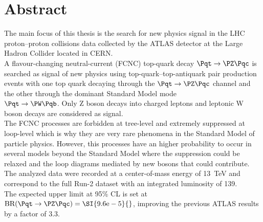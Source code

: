 \chapter*{Abstract}        %

\vspace{-1cm}
\begin{adjustwidth}{1.5cm}{1.5cm}
	The main focus of this thesis is the search for new physics signal in the
	LHC proton–proton collisions data collected by the ATLAS detector at 
	the Large Hadron Collider located in CERN.\\
	A flavour-changing neutral-current (FCNC) top-quark decay
	$\Pqt\rightarrow\PZ\Pqc$ is searched as signal of new physics using 
	top-quark–top-antiquark pair production events with one top quark 
	decaying through the $\Pqt\rightarrow\PZ\Pqc$ channel and the other 
	through the dominant Standard Model mode\\ $\Pqt\rightarrow\PW\Pqb$. 
	Only Z boson decays into charged leptons and leptonic W boson decays 
	are considered as signal.\\
	The FCNC processes are forbidden at tree-level and extremely suppressed at loop-level 
	which is why they are very rare phenomena in the Standard Model of particle physics.
	However, this processes have an higher probability to occur in several models beyond the Standard Model where the suppression could be relaxed and the loop diagrams mediated by new bosons that could contribute.\\
	The analyzed data were recorded at a center-of-mass energy of \SI{13}{\TeV} and correspond to the full Run-2 dataset with an integrated luminosity of \SI{139}{\ifb}.\\
	The expected upper limit at 95\% CL is set at $\mathrm{BR (\Pqt\rightarrow\PZ\Pqc)=\SI{9.6e-5}{}}$, improving the previous ATLAS results by a factor of 3.3.
	
\end{adjustwidth}



